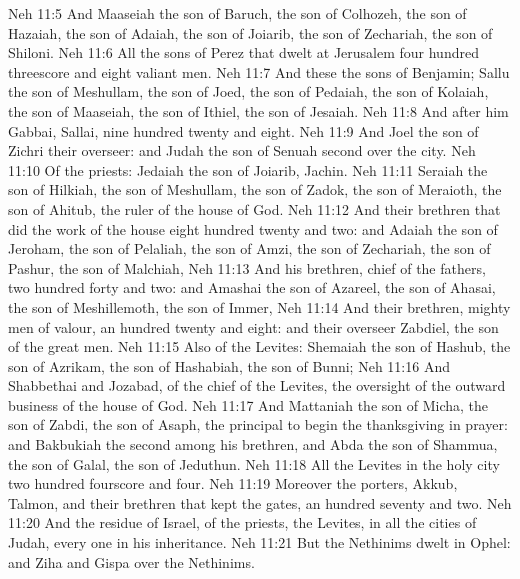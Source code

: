 \vs Neh 11:5 And Maaseiah the son of Baruch, the son of Colhozeh, the son of Hazaiah, the son of Adaiah, the son of Joiarib, the son of Zechariah, the son of Shiloni.
\vs Neh 11:6 All the sons of Perez that dwelt at Jerusalem  four hundred threescore and eight valiant men.
\vs Neh 11:7 And these  the sons of Benjamin; Sallu the son of Meshullam, the son of Joed, the son of Pedaiah, the son of Kolaiah, the son of Maaseiah, the son of Ithiel, the son of Jesaiah.
\vs Neh 11:8 And after him Gabbai, Sallai, nine hundred twenty and eight.
\vs Neh 11:9 And Joel the son of Zichri  their overseer: and Judah the son of Senuah  second over the city.
\vs Neh 11:10 Of the priests: Jedaiah the son of Joiarib, Jachin.
\vs Neh 11:11 Seraiah the son of Hilkiah, the son of Meshullam, the son of Zadok, the son of Meraioth, the son of Ahitub,  the ruler of the house of God.
\vs Neh 11:12 And their brethren that did the work of the house  eight hundred twenty and two: and Adaiah the son of Jeroham, the son of Pelaliah, the son of Amzi, the son of Zechariah, the son of Pashur, the son of Malchiah,
\vs Neh 11:13 And his brethren, chief of the fathers, two hundred forty and two: and Amashai the son of Azareel, the son of Ahasai, the son of Meshillemoth, the son of Immer,
\vs Neh 11:14 And their brethren, mighty men of valour, an hundred twenty and eight: and their overseer  Zabdiel, the son of  the great men.
\vs Neh 11:15 Also of the Levites: Shemaiah the son of Hashub, the son of Azrikam, the son of Hashabiah, the son of Bunni;
\vs Neh 11:16 And Shabbethai and Jozabad, of the chief of the Levites,  the oversight of the outward business of the house of God.
\vs Neh 11:17 And Mattaniah the son of Micha, the son of Zabdi, the son of Asaph,  the principal to begin the thanksgiving in prayer: and Bakbukiah the second among his brethren, and Abda the son of Shammua, the son of Galal, the son of Jeduthun.
\vs Neh 11:18 All the Levites in the holy city  two hundred fourscore and four.
\vs Neh 11:19 Moreover the porters, Akkub, Talmon, and their brethren that kept the gates,  an hundred seventy and two.
\vs Neh 11:20 And the residue of Israel, of the priests,  the Levites,  in all the cities of Judah, every one in his inheritance.
\vs Neh 11:21 But the Nethinims dwelt in Ophel: and Ziha and Gispa  over the Nethinims.

